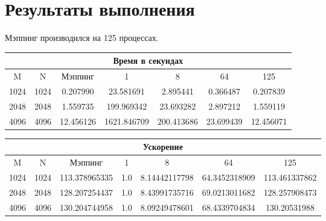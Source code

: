 \documentclass[12pt]{article}
\begin{document}
    \section{Результаты выполнения}
        Мэппинг производился на 125 процессах.
        \begin{center}
            \begin{tabular}{|c|c|c|c|c|c|c|}
                \hline
                \multicolumn{7}{|c|}{Время в секундах} \\
                \hline
                M & N & Мэппинг & 1 & 8 & 64 & 125 \\
                \hline
                1024 & 1024 & 0.207990 & 23.581691 & 2.895441 & 0.366487 & 0.207839 \\
                \hline
                2048 & 2048 & 1.559735 & 199.969342 & 23.693282 & 2.897212 & 1.559119 \\
                \hline
                4096 & 4096 & 12.456126 & 1621.846709 & 200.413686 & 23.699439 & 12.456071 \\
                \hline
            \end{tabular}
        \end{center}

        \begin{center}
            \begin{tabular}{|c|c|c|c|c|c|c|}
                \hline
                \multicolumn{7}{|c|}{Ускорение} \\
                \hline
                M & N & Мэппинг & 1 & 8 & 64 & 125 \\
                \hline
                1024 & 1024 & 113.378965335 & 1.0 & 8.14442117798 & 64.3452318909 & 113.461337862 \\
                \hline
                2048 & 2048 & 128.207254437 & 1.0 & 8.43991735716 & 69.0213011682 & 128.257908473 \\
                \hline
                4096 & 4096 & 130.204744958 & 1.0 & 8.09249478601 & 68.4339704834 & 130.20531988 \\
                \hline
            \end{tabular}
        \end{center}
\end{document}
